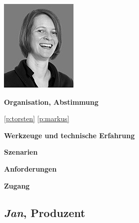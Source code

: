 \begin{multicols}{2}

\begin{center}
\includegraphics[width=0.5\columnwidth]{media/jorinde.jpg}
\end{center}


\textbf{Organisation, Abstimmung}

\ref{p:torsten}
\ref{p:markus}

\textbf{Werkzeuge und technische Erfahrung}

\columnbreak

\textbf{Szenarien}

\textbf{Anforderungen}

\textbf{Zugang}

\end{multicols}

\pagebreak

\subsection{\emph{Jan}, Produzent}\label{p:jan}

